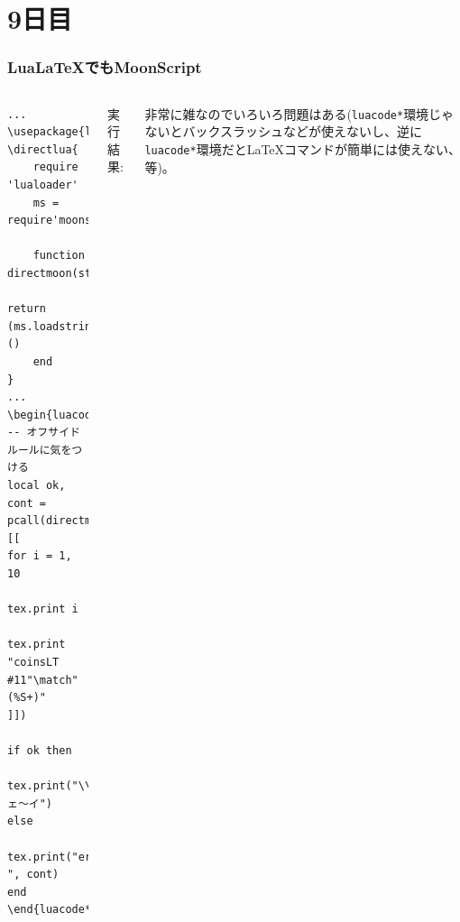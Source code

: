 \section{9日目}
\begin{frame}[fragile]
	\frametitle{{\rm{}Lua\LaTeX{}}でもMoonScript}
	\begin{columns}
		\column[t]{.4\hsize}
		\tiny
		\begin{lstlisting}[numbers=none=LaTeX]
...
\usepackage{luacode}
\directlua{
	require 'lualoader'
	ms = require'moonscript.base'

	function directmoon(str)
		return (ms.loadstring(str))()
	end
}
...
\begin{luacode*}
-- オフサイドルールに気をつける
local ok, cont = pcall(directmoon,[[
for i = 1, 10
	tex.print i

tex.print "coinsLT #11"\match"(%S+)"
]])

if ok then
	tex.print("\\\\イェ〜イ")
else
	tex.print("error: ", cont)
end
\end{luacode*}
		\end{lstlisting}
		\column[t]{.6\hsize}

\alert{実行結果:}


\vspace{2\zw}
	非常に雑なのでいろいろ問題はある{\scriptsize{}(\lstinline|luacode*|環境じゃないとバックスラッシュなどが使えないし、逆に\lstinline|luacode*|環境だと{\rm\LaTeX{}}コマンドが簡単には使えない、等)}。
	\end{columns}
\end{frame}
